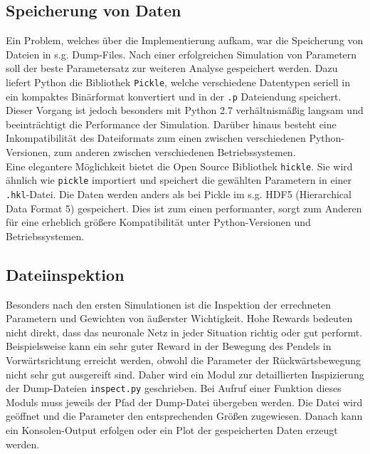 	\subsection{Speicherung von Daten}
		Ein Problem, welches über die Implementierung aufkam, war die Speicherung von Dateien in s.g. Dump-Files. Nach einer erfolgreichen Simulation von Parametern soll der beste Parametersatz zur weiteren Analyse gespeichert werden. Dazu liefert Python die Bibliothek \texttt{Pickle}, welche verschiedene Datentypen seriell in ein kompaktes Binärformat konvertiert und in der \texttt{.p} Dateiendung speichert. Dieser Vorgang ist jedoch besonders mit Python 2.7 verhältnismäßig langsam und beeinträchtigt die Performance der Simulation. Darüber hinaus besteht eine Inkompatibilität des Dateiformats zum einen zwischen verschiedenen Python-Versionen, zum anderen zwischen verschiedenen Betriebssystemen.\\
		Eine elegantere Möglichkeit bietet die Open Source Bibliothek \texttt{hickle}. Sie wird ähnlich wie \texttt{pickle} importiert und speichert die gewählten Parametern in einer \texttt{.hkl}-Datei. Die Daten werden anders als bei Pickle im s.g. HDF5 (Hierarchical Data Format 5) gespeichert. Dies ist zum einen performanter, sorgt zum Anderen für eine erheblich größere Kompatibilität unter Python-Versionen und Betriebssystemen.
	\subsection{Dateiinspektion}
		Besonders nach den ersten Simulationen ist die Inspektion der errechneten Parametern und Gewichten von äußerster Wichtigkeit. Hohe Rewards bedeuten nicht direkt, dass das neuronale Netz in jeder Situation richtig oder gut performt. Beispielsweise kann ein sehr guter Reward in der Bewegung des Pendels in Vorwärtsrichtung erreicht werden, obwohl die Parameter der Rückwärtsbewegung nicht sehr gut ausgereift sind. Daher wird ein Modul zur detaillierten Inspizierung der Dump-Dateien \texttt{inspect.py} geschrieben. Bei Aufruf einer Funktion dieses Moduls muss jeweils der Pfad der Dump-Datei übergeben werden. Die Datei wird geöffnet und die Parameter den entsprechenden Größen zugewiesen. Danach kann ein Konsolen-Output erfolgen oder ein Plot der gespeicherten Daten erzeugt werden.


